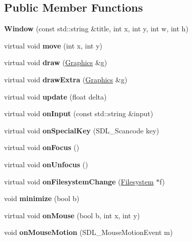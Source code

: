 \subsection*{Public Member Functions}
\begin{DoxyCompactItemize}
\item 
\hypertarget{class_window_a13073c18448edb5af37659eb910a6457}{}\label{class_window_a13073c18448edb5af37659eb910a6457} 
{\bfseries Window} (const std\+::string \&title, int x, int y, int w, int h)
\item 
\hypertarget{class_window_a00f3bcd540087f25bf85fbc14260c6a6}{}\label{class_window_a00f3bcd540087f25bf85fbc14260c6a6} 
virtual void {\bfseries move} (int x, int y)
\item 
\hypertarget{class_window_a4691b11ae3bf79e96b5c64e4cc1db91e}{}\label{class_window_a4691b11ae3bf79e96b5c64e4cc1db91e} 
virtual void {\bfseries draw} (\hyperlink{class_graphics}{Graphics} \&g)
\item 
\hypertarget{class_window_a00e804d5f11153887fde65f9298c4723}{}\label{class_window_a00e804d5f11153887fde65f9298c4723} 
virtual void {\bfseries draw\+Extra} (\hyperlink{class_graphics}{Graphics} \&g)
\item 
\hypertarget{class_window_addf18acb7913c944b252a9e1d829d870}{}\label{class_window_addf18acb7913c944b252a9e1d829d870} 
virtual void {\bfseries update} (float delta)
\item 
\hypertarget{class_window_ac3a94fd42d4cb51d70f5b20e5c358b8c}{}\label{class_window_ac3a94fd42d4cb51d70f5b20e5c358b8c} 
virtual void {\bfseries on\+Input} (const std\+::string \&input)
\item 
\hypertarget{class_window_ac8219c38f63a27e107e11c0ce996c8ee}{}\label{class_window_ac8219c38f63a27e107e11c0ce996c8ee} 
virtual void {\bfseries on\+Special\+Key} (S\+D\+L\+\_\+\+Scancode key)
\item 
\hypertarget{class_window_a856e913fd554818e67c8bc0734f3b657}{}\label{class_window_a856e913fd554818e67c8bc0734f3b657} 
virtual void {\bfseries on\+Focus} ()
\item 
\hypertarget{class_window_ab849a2c1b4c39b1940c3850d7b0c4dc4}{}\label{class_window_ab849a2c1b4c39b1940c3850d7b0c4dc4} 
virtual void {\bfseries on\+Unfocus} ()
\item 
\hypertarget{class_window_a1284aaa97faa73b4134f7dbf96855cb9}{}\label{class_window_a1284aaa97faa73b4134f7dbf96855cb9} 
virtual void {\bfseries on\+Filesystem\+Change} (\hyperlink{class_filesystem}{Filesystem} $\ast$f)
\item 
\hypertarget{class_window_a5736b4b3555f5a3dd28b6348f7ef4495}{}\label{class_window_a5736b4b3555f5a3dd28b6348f7ef4495} 
void {\bfseries minimize} (bool b)
\item 
\hypertarget{class_window_af602ba77befac67a28be115077bd2879}{}\label{class_window_af602ba77befac67a28be115077bd2879} 
virtual void {\bfseries on\+Mouse} (bool b, int x, int y)
\item 
\hypertarget{class_window_ac3d60de0a45e3ebca44c65176074ebaa}{}\label{class_window_ac3d60de0a45e3ebca44c65176074ebaa} 
void {\bfseries on\+Mouse\+Motion} (S\+D\+L\+\_\+\+Mouse\+Motion\+Event m)
\end{DoxyCompactItemize}
